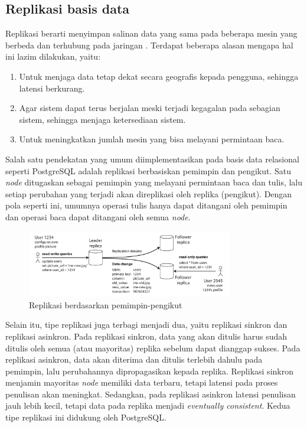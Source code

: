 \subsection{Replikasi basis data}

Replikasi berarti menyimpan salinan data yang sama pada beberapa mesin yang berbeda dan terhubung pada jaringan \parencite{dataIntensiveApplications}. Terdapat beberapa alasan mengapa hal ini lazim dilakukan, yaitu:

\begin{enumerate}
    \item Untuk menjaga data tetap dekat secara geografis kepada pengguna, sehingga latensi berkurang.
    \item Agar sistem dapat terus berjalan meski terjadi kegagalan pada sebagian sistem, sehingga menjaga ketersediaan sistem.
    \item Untuk meningkatkan jumlah mesin yang bisa melayani permintaan baca.
\end{enumerate}

Salah satu pendekatan yang umum diimplementasikan pada basis data relasional seperti PostgreSQL adalah replikasi berbasiskan pemimpin dan pengikut. Satu \textit{node} ditugaskan sebagai pemimpin yang melayani permintaan baca dan tulis, lalu setiap perubahan yang terjadi akan direplikasi oleh replika (pengikut). Dengan pola seperti ini, umumnya operasi tulis hanya dapat ditangani oleh pemimpin dan operasi baca dapat ditangani oleh semua \textit{node}.

\begin{figure}[htbp]
    \centering
    \includegraphics[width=0.8\textwidth]{resources/chapter-2/leader-based-replication.png}
    \caption{Replikasi berdasarkan pemimpin-pengikut \parencite{dataIntensiveApplications}}
    \label{fig:leader-based-replication}
\end{figure}

\pagebreak

Selain itu, tipe replikasi juga terbagi menjadi dua, yaitu replikasi sinkron dan replikasi asinkron. Pada replikasi sinkron, data yang akan ditulis harus sudah ditulis oleh semua (atau mayoritas) replika sebelum dapat dianggap sukses. Pada replikasi asinkron, data akan diterima dan ditulis terlebih dahulu pada pemimpin, lalu perubahannya dipropagasikan kepada replika. Replikasi sinkron menjamin mayoritas \textit{node} memiliki data terbaru, tetapi latensi pada proses penulisan akan meningkat. Sedangkan, pada replikasi asinkron latensi penulisan jauh lebih kecil, tetapi data pada replika menjadi \textit{eventually consistent}. Kedua tipe replikasi ini didukung oleh PostgreSQL.
